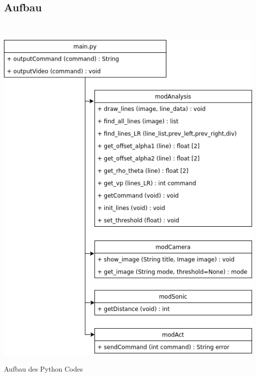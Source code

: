 \documentclass[a4paper,12pt]{article}
\begin{document}
    \subsection{Aufbau}
    \ \\
    \begin{minipage}{\columnwidth}
      \makeatletter
      \def\@captype{figure}
      \makeatother
      \centering
      \includegraphics[width=0.8\linewidth]{images/code-flowchart.png}
      \caption{Aufbau des Python Codes}
      \label{fig:image-01}
    \end{minipage}
    \ \\
\end{document}
